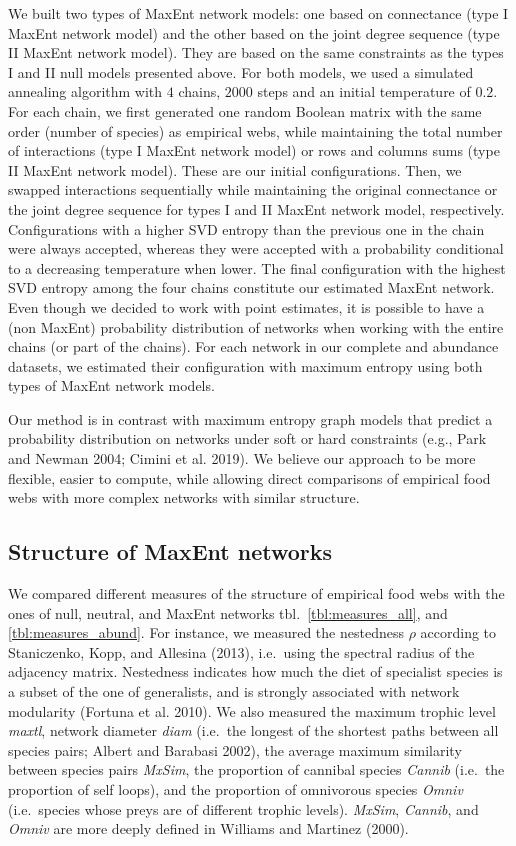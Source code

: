 \documentclass[11pt]{article}
\begin{document}
We built two types of MaxEnt network models: one based on connectance
(type I MaxEnt network model) and the other based on the joint degree
sequence (type II MaxEnt network model). They are based on the same
constraints as the types I and II null models presented above. For both
models, we used a simulated annealing algorithm with \(4\) chains,
\(2000\) steps and an initial temperature of \(0.2\). For each chain, we
first generated one random Boolean matrix with the same order (number of
species) as empirical webs, while maintaining the total number of
interactions (type I MaxEnt network model) or rows and columns sums
(type II MaxEnt network model). These are our initial configurations.
Then, we swapped interactions sequentially while maintaining the
original connectance or the joint degree sequence for types I and II
MaxEnt network model, respectively. Configurations with a higher SVD
entropy than the previous one in the chain were always accepted, whereas
they were accepted with a probability conditional to a decreasing
temperature when lower. The final configuration with the highest SVD
entropy among the four chains constitute our estimated MaxEnt network.
Even though we decided to work with point estimates, it is possible to
have a (non MaxEnt) probability distribution of networks when working
with the entire chains (or part of the chains). For each network in our
complete and abundance datasets, we estimated their configuration with
maximum entropy using both types of MaxEnt network models.

Our method is in contrast with maximum entropy graph models that predict
a probability distribution on networks under soft or hard constraints
(e.g., Park and Newman 2004; Cimini et al. 2019). We believe our
approach to be more flexible, easier to compute, while allowing direct
comparisons of empirical food webs with more complex networks with
similar structure.

\hypertarget{structure-of-maxent-networks}{%
\subsection{Structure of MaxEnt
networks}\label{structure-of-maxent-networks}}

We compared different measures of the structure of empirical food webs
with the ones of null, neutral, and MaxEnt networks
tbl.~\ref{tbl:measures_all}, and \ref{tbl:measures_abund}. For instance,
we measured the nestedness \(\rho\) according to Staniczenko, Kopp, and
Allesina (2013), i.e.~using the spectral radius of the adjacency matrix.
Nestedness indicates how much the diet of specialist species is a subset
of the one of generalists, and is strongly associated with network
modularity (Fortuna et al. 2010). We also measured the maximum trophic
level \emph{maxtl}, network diameter \emph{diam} (i.e.~the longest of
the shortest paths between all species pairs; Albert and Barabasi 2002),
the average maximum similarity between species pairs \emph{MxSim}, the
proportion of cannibal species \emph{Cannib} (i.e.~the proportion of
self loops), and the proportion of omnivorous species \emph{Omniv}
(i.e.~species whose preys are of different trophic levels).
\emph{MxSim}, \emph{Cannib}, and \emph{Omniv} are more deeply defined in
Williams and Martinez (2000).
\end{document}
